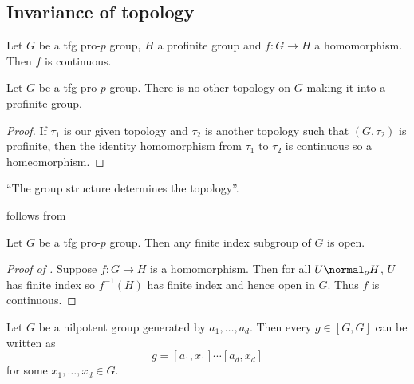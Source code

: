 \documentclass[a4paper]{article}
\begin{document}
\subsection{Invariance of topology}

\begin{theorem}
  \label{thm:homomorphism from pro-p group is continuous}
  Let \(G\) be a tfg pro-\(p\) group, \(H\) a profinite group and \(f: G \to H\) a homomorphism. Then \(f\) is continuous.
\end{theorem}

\begin{corollary}
  Let \(G\) be a tfg pro-\(p\) group. There is no other topology on \(G\) making it into a profinite group.
\end{corollary}

\begin{proof}
  If \(\tau_1\) is our given topology and \(\tau_2\) is another topology such that \((G, \tau_2)\) is profinite, then the identity homomorphism from \(\tau_1\) to \(\tau_2\) is continuous so a homeomorphism.
\end{proof}

``The group structure determines the topology''.

 follows from

\begin{theorem}
  \label{thm:finite index subgroup of pro-p group is open}
  Let \(G\) be a tfg pro-\(p\) group. Then any finite index subgroup of \(G\) is open.
\end{theorem}

\begin{proof}[Proof of ]
  Suppose \(f: G \to H\) is a homomorphism. Then for all \(U \normal_o H\), \(U\) has finite index so \(f^{-1}(H)\) has finite index and hence open in \(G\). Thus \(f\) is continuous.
\end{proof}

\begin{lemma}
  Let \(G\) be a nilpotent group generated by \(a_1, \dots, a_d\). Then every \(g \in [G, G]\) can be written as
  \[
    g = [a_1, x_1] \cdots [a_d, x_d]
  \]
  for some \(x_1, \dots, x_d \in G\).
\end{lemma}
\end{document}
